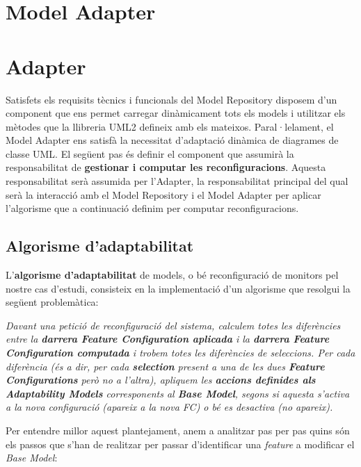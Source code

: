 \section{Model Adapter}


\section{Adapter}

Satisfets els requisits tècnics i funcionals del Model Repository disposem d'un component que ens permet carregar dinàmicament tots els models i utilitzar els mètodes que la llibreria UML2 defineix amb els mateixos. Paral·lelament, el Model Adapter ens satisfà la necessitat d'adaptació dinàmica de diagrames de classe UML. El següent pas és definir el component que assumirà la responsabilitat de \textbf{gestionar i computar les reconfiguracions}. Aquesta responsabilitat serà assumida per l'Adapter, la responsabilitat principal del qual serà la interacció amb el Model Repository i el Model Adapter per aplicar l'algorisme que a continuació definim per computar reconfiguracions.\\

\subsection{Algorisme d'adaptabilitat}

L'\textbf{algorisme d'adaptabilitat} de models, o bé reconfiguració de monitors pel nostre cas d'estudi, consisteix en la implementació d'un algorisme que resolgui la següent problemàtica:

\begin{center}
\textit{Davant una petició de reconfiguració del sistema, calculem totes les diferències entre la \textbf{darrera Feature Configuration aplicada} i la \textbf{darrera Feature Configuration computada} i trobem totes les diferències de seleccions. Per cada diferència (és a dir, per cada \textbf{selection} present a una de les dues \textbf{Feature Configurations} però no a l'altra), apliquem les \textbf{accions definides als Adaptability Models} corresponents al \textbf{Base Model}, segons si aquesta s'activa a la nova configuració (apareix a la nova FC) o bé es desactiva (no apareix).}
\end{center}

Per entendre millor aquest plantejament, anem a analitzar pas per pas quins són els passos que s'han de realitzar per passar d'identificar una \textit{feature} a modificar el \textit{Base Model}:

